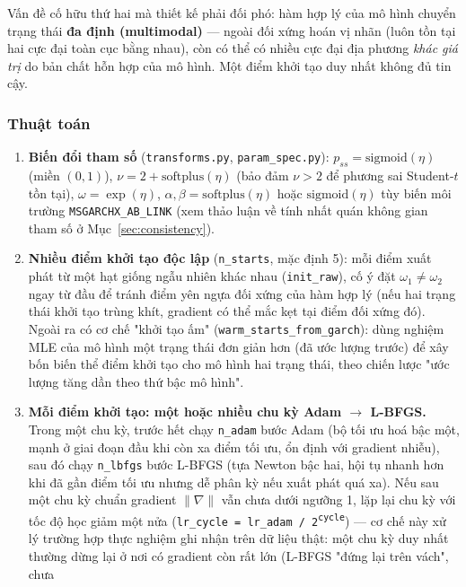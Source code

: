 \documentclass[11pt,a4paper]{article}
\newcommand{\code}[1]{\texttt{#1}}
\newcommand{\file}[1]{\texttt{#1}}
\begin{document}
Vấn đề cố hữu thứ hai mà thiết kế phải đối phó: hàm hợp lý của mô hình chuyển trạng
thái \textbf{đa định (multimodal)} --- ngoài đối xứng hoán vị nhãn (luôn tồn tại hai
cực đại toàn cục bằng nhau), còn có thể có nhiều cực đại địa phương \emph{khác giá
trị} do bản chất hỗn hợp của mô hình. Một điểm khởi tạo duy nhất không đủ tin cậy.

\subsubsection{Thuật toán}

\begin{enumerate}
  \item \textbf{Biến đổi tham số} (\file{transforms.py}, \file{param\_spec.py}):
    $p_{ss} = \mathrm{sigmoid}(\eta)$ (miền $(0,1)$), $\nu = 2 + \mathrm{softplus}(\eta)$
    (bảo đảm $\nu>2$ để phương sai Student-$t$ tồn tại), $\omega = \exp(\eta)$,
    $\alpha,\beta = \mathrm{softplus}(\eta)$ hoặc $\mathrm{sigmoid}(\eta)$ tùy biến môi
    trường \code{MSGARCHX\_AB\_LINK} (xem thảo luận về tính nhất quán không gian tham
    số ở Mục~\ref{sec:consistency}).
  \item \textbf{Nhiều điểm khởi tạo độc lập} (\code{n\_starts}, mặc định 5): mỗi điểm
    xuất phát từ một hạt giống ngẫu nhiên khác nhau (\code{init\_raw}), cố ý đặt
    $\omega_1 \ne \omega_2$ ngay từ đầu để tránh điểm yên ngựa đối xứng của hàm hợp lý
    (nếu hai trạng thái khởi tạo trùng khít, gradient có thể mắc kẹt tại điểm đối
    xứng đó). Ngoài ra có cơ chế "khởi tạo ấm" (\code{warm\_starts\_from\_garch}):
    dùng nghiệm MLE của mô hình một trạng thái đơn giản hơn (đã ước lượng trước) để
    xây bốn biến thể điểm khởi tạo cho mô hình hai trạng thái, theo chiến lược
    "ước lượng tăng dần theo thứ bậc mô hình".
  \item \textbf{Mỗi điểm khởi tạo: một hoặc nhiều chu kỳ Adam $\to$ L-BFGS.} Trong
    một chu kỳ, trước hết chạy \code{n\_adam} bước Adam (bộ tối ưu hoá bậc một, mạnh
    ở giai đoạn đầu khi còn xa điểm tối ưu, ổn định với gradient nhiễu), sau đó chạy
    \code{n\_lbfgs} bước L-BFGS (tựa Newton bậc hai, hội tụ nhanh hơn khi đã gần điểm
    tối ưu nhưng dễ phân kỳ nếu xuất phát quá xa). Nếu sau một chu kỳ chuẩn gradient
    $\lVert\nabla\rVert$ vẫn chưa dưới ngưỡng 1, lặp lại chu kỳ với tốc độ học giảm
    một nửa (\code{lr\_cycle = lr\_adam / 2\textsuperscript{cycle}}) --- cơ chế này
    xử lý trường hợp thực nghiệm ghi nhận trên dữ liệu thật: một chu kỳ duy nhất
    thường dừng lại ở nơi có gradient còn rất lớn (L-BFGS "đứng lại trên vách", chưa

\end{enumerate}
\end{document}
